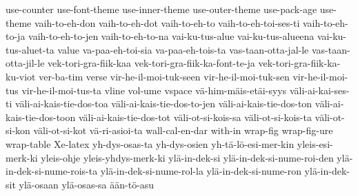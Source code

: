 {  use-counter
  use-font-theme
  use-inner-theme
  use-outer-theme
  use-pack-age
  use-theme
  vaih-to-eh-don
  vaih-to-eh-dot
  vaih-to-eh-to
  vaih-to-eh-toi-ses-ti
  vaih-to-eh-to-ja
  vaih-to-eh-to-jen
  vaih-to-eh-to-na
  vai-ku-tus-alue
  vai-ku-tus-alueena
  vai-ku-tus-aluet-ta
  value
  va-paa-eh-toi-sia
  va-paa-eh-tois-ta
  vas-taan-otta-jal-le
  vas-taan-otta-jil-le
  vek-tori-gra-fiik-kaa
  vek-tori-gra-fiik-ka-font-te-ja
  vek-tori-gra-fiik-ka-ku-viot
  ver-ba-tim
  verse
  vir-he-il-moi-tuk-seen
  vir-he-il-moi-tuk-sen
  vir-he-il-moi-tus
  vir-he-il-moi-tus-ta
  vline
  vol-ume
  vspace
  vä-him-mäis-etäi-syys
  väli-ai-kai-ses-ti
  väli-ai-kais-tie-dos-toa
  väli-ai-kais-tie-dos-to-jen
  väli-ai-kais-tie-dos-ton
  väli-ai-kais-tie-dos-toon
  väli-ai-kais-tie-dos-tot
  väli-ot-si-kois-sa
  väli-ot-si-kois-ta
  väli-ot-si-kon
  väli-ot-si-kot
  vä-ri-asioi-ta
  wall-cal-en-dar
  with-in
  wrap-fig
  wrap-fig-ure
  wrap-table
  Xe-latex
  yh-dys-osas-ta
  yh-dys-osien
  yh-tä-lö-esi-mer-kin
  yleis-esi-merk-ki
  yleis-ohje
  yleis-yhdys-merk-ki
  ylä-in-dek-si
  ylä-in-dek-si-nume-roi-den
  ylä-in-dek-si-nume-rois-ta
  ylä-in-dek-si-nume-rol-la
  ylä-in-dek-si-nume-ron
  ylä-in-dek-sit
  ylä-osaan
  ylä-osas-sa
  ään-tö-asu
}
